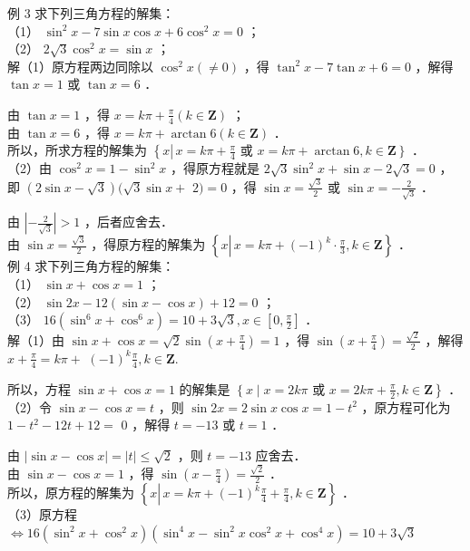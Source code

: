 \documentclass[10pt]{article}
\begin{document}
例 3 求下列三角方程的解集：\\
（1） \(\sin ^{2} x-7 \sin x \cos x+6 \cos ^{2} x=0\) ；\\
（2） \(2 \sqrt{3} \cos ^{2} x=\sin x\) ；\\
解（1）原方程两边同除以 \(\cos ^{2} x(\neq 0)\) ，得 \(\tan ^{2} x-7 \tan x+6=0\) ，解得 \(\tan x=1\) 或 \(\tan x=6\) ．

由 \(\tan x=1\) ，得 \(x=k \pi+\frac{\pi}{4}(k \in \mathbf{Z})\) ；\\
由 \(\tan x=6\) ，得 \(x=k \pi+\arctan 6(k \in \mathbf{Z})\) ．\\
所以，所求方程的解集为 \(\left\{x \left\lvert\, x=k \pi+\frac{\pi}{4}\right.\right.\) 或 \(\left.x=k \pi+\arctan 6, k \in \mathbf{Z}\right\}\) ．\\
（2）由 \(\cos ^{2} x=1-\sin ^{2} x\) ，得原方程就是 \(2 \sqrt{3} \sin ^{2} x+\sin x-2 \sqrt{3}=0\) ，即 \((2 \sin x-\sqrt{3})(\sqrt{3} \sin x+\) \(2)=0\) ，得 \(\sin x=\frac{\sqrt{3}}{2}\) 或 \(\sin x=-\frac{2}{\sqrt{3}}\) ．

由 \(\left|-\frac{2}{\sqrt{3}}\right|>1\) ，后者应舍去．\\
由 \(\sin x=\frac{\sqrt{3}}{2}\) ，得原方程的解集为 \(\left\{x \left\lvert\, x=k \pi+(-1)^{k} \cdot \frac{\pi}{3}\right., k \in \mathbf{Z}\right\}\) ．\\
例 4 求下列三角方程的解集：\\
（1） \(\sin x+\cos x=1\) ；\\
（2） \(\sin 2 x-12(\sin x-\cos x)+12=0\) ；\\
（3） \(16\left(\sin ^{6} x+\cos ^{6} x\right)=10+3 \sqrt{3}, x \in\left[0, \frac{\pi}{2}\right]\) ．\\
解（1）由 \(\sin x+\cos x=\sqrt{2} \sin \left(x+\frac{\pi}{4}\right)=1\) ，得 \(\sin \left(x+\frac{\pi}{4}\right)=\frac{\sqrt{2}}{2}\) ，解得 \(x+\frac{\pi}{4}=k \pi+\) \((-1)^{k} \frac{\pi}{4}, k \in \mathbf{Z}\).

所以，方程 \(\sin x+\cos x=1\) 的解集是 \(\left\{x \mid x=2 k \pi\right.\) 或 \(\left.x=2 k \pi+\frac{\pi}{2}, k \in \mathbf{Z}\right\}\) ．\\
（2）令 \(\sin x-\cos x=t\) ，则 \(\sin 2 x=2 \sin x \cos x=1-t^{2}\) ，原方程可化为 \(1-t^{2}-12 t+12=\) 0 ，解得 \(t=-13\) 或 \(t=1\) ．

由 \(|\sin x-\cos x|=|t| \leqslant \sqrt{2}\) ，则 \(t=-13\) 应舍去．\\
由 \(\sin x-\cos x=1\) ，得 \(\sin \left(x-\frac{\pi}{4}\right)=\frac{\sqrt{2}}{2}\) ．\\
所以，原方程的解集为 \(\left\{x \left\lvert\, x=k \pi+(-1)^{k} \frac{\pi}{4}+\frac{\pi}{4}\right., k \in \mathbf{Z}\right\}\) ．\\
（3）原方程 \(\Leftrightarrow 16\left(\sin ^{2} x+\cos ^{2} x\right)\left(\sin ^{4} x-\sin ^{2} x \cos ^{2} x+\cos ^{4} x\right)=10+3 \sqrt{3}\)
\end{document}
